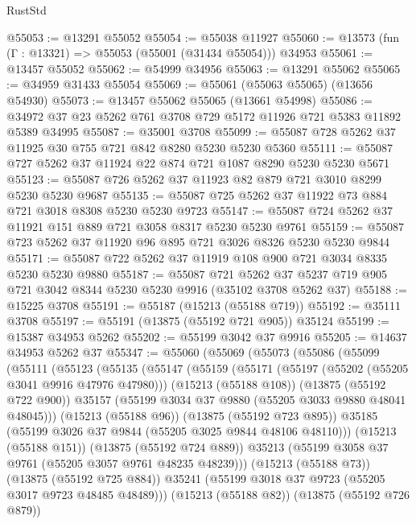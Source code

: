 \begin{lexlean}{RustStd}
\begin{coremodule}
@55053 := @13291 @55052
@55054 := @55038 @11927
@55060 := @13573 (fun (Γ : @13321) => @55053 (@55001 (@31434 @55054))) @34953
@55061 := @13457 @55052
@55062 := @54999 @34956
@55063 := @13291 @55062
@55065 := @34959 @31433 @55054
@55069 := @55061 (@55063 @55065) (@13656 @54930)
@55073 := @13457 @55062 @55065 (@13661 @54998)
@55086 := @34972 @37 @23 @5262 @761 @3708 @729 @5172 @11926 @721 @5383 @11892 @5389 @34995
@55087 := @35001 @3708
@55099 := @55087 @728 @5262 @37 @11925 @30 @755 @721 @842 @8280 @5230 @5230 @5360
@55111 := @55087 @727 @5262 @37 @11924 @22 @874 @721 @1087 @8290 @5230 @5230 @5671
@55123 := @55087 @726 @5262 @37 @11923 @82 @879 @721 @3010 @8299 @5230 @5230 @9687
@55135 := @55087 @725 @5262 @37 @11922 @73 @884 @721 @3018 @8308 @5230 @5230 @9723
@55147 := @55087 @724 @5262 @37 @11921 @151 @889 @721 @3058 @8317 @5230 @5230 @9761
@55159 := @55087 @723 @5262 @37 @11920 @96 @895 @721 @3026 @8326 @5230 @5230 @9844
@55171 := @55087 @722 @5262 @37 @11919 @108 @900 @721 @3034 @8335 @5230 @5230 @9880
@55187 := @55087
    @721
    @5262
    @37
    @5237
    @719
    @905
    @721
    @3042
    @8344
    @5230
    @5230
    @9916
    (@35102 @3708 @5262 @37)
@55188 := @15225 @3708
@55191 := @55187 (@15213 (@55188 @719))
@55192 := @35111 @3708
@55197 := @55191 (@13875 (@55192 @721 @905)) @35124
@55199 := @15387 @34953 @5262
@55202 := @55199 @3042 @37 @9916
@55205 := @14637 @34953 @5262 @37
@55347 := @55060
    (@55069
      (@55073
        (@55086
          (@55099
            (@55111
              (@55123
                (@55135
                  (@55147
                    (@55159
                      (@55171
                        (@55197 (@55202 (@55205 @3041 @9916 @47976 @47980)))
                        (@15213 (@55188 @108))
                        (@13875 (@55192 @722 @900))
                        @35157
                        (@55199 @3034 @37 @9880 (@55205 @3033 @9880 @48041 @48045)))
                      (@15213 (@55188 @96))
                      (@13875 (@55192 @723 @895))
                      @35185
                      (@55199 @3026 @37 @9844 (@55205 @3025 @9844 @48106 @48110)))
                    (@15213 (@55188 @151))
                    (@13875 (@55192 @724 @889))
                    @35213
                    (@55199 @3058 @37 @9761 (@55205 @3057 @9761 @48235 @48239)))
                  (@15213 (@55188 @73))
                  (@13875 (@55192 @725 @884))
                  @35241
                  (@55199 @3018 @37 @9723 (@55205 @3017 @9723 @48485 @48489)))
                (@15213 (@55188 @82))
                (@13875 (@55192 @726 @879))

\end{coremodule}
\end{lexlean}
